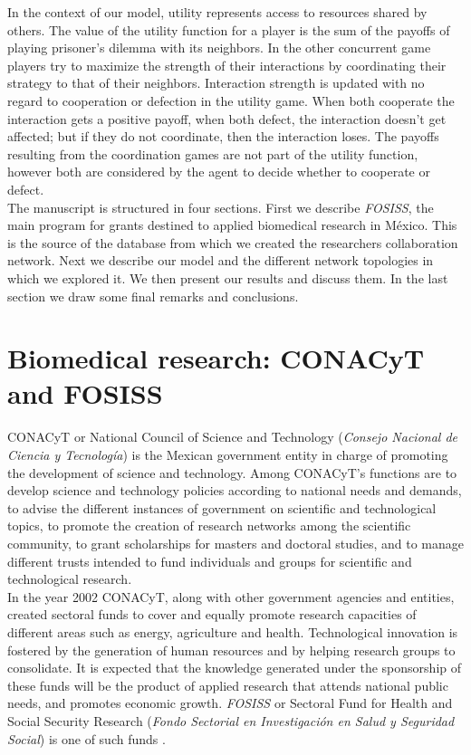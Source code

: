\documentclass{bmcart}
\begin{document}
In the context of our model, utility represents access to resources
shared by others. The value of the utility function for a player is
the sum of the payoffs of playing prisoner's dilemma with its
neighbors. In the other concurrent game players try to maximize the
strength of their interactions by coordinating their strategy to that
of their neighbors. Interaction strength is updated with no regard to
cooperation or defection in the utility game. When both cooperate the
interaction gets a positive payoff, when both defect, the interaction
doesn't get affected; but if they do not coordinate, then the
interaction loses. The payoffs resulting from the coordination games
are not part of the utility function, however both are considered by
the agent to decide whether to cooperate or defect. \\

The manuscript is structured in four sections. First we describe
\textit{FOSISS}, the main program for grants destined to applied
biomedical research in M\'exico. This is the source of the database
from which we created the researchers collaboration network. Next we
describe our model and the different network topologies in which we
explored it.  We then present our results and discuss them. In the
last section we draw some final remarks and conclusions.

\section*{Biomedical research: CONACyT and FOSISS}

CONACyT or National Council of Science and Technology (\emph{Consejo
  Nacional de Ciencia y Tecnolog\'ia}) is the Mexican government
entity in charge of promoting the development of science and
technology.  Among CONACyT's functions are to develop science and
technology policies according to national needs and demands, to advise
the different instances of government on scientific and technological
topics, to promote the creation of research networks among the
scientific community, to grant scholarships for masters and doctoral
studies, and to manage different trusts intended to fund individuals
and groups for scientific and technological research.\\

In the year 2002 CONACyT, along with other government agencies and
entities, created sectoral funds to cover and equally promote research
capacities of different areas such as energy, agriculture and
health. Technological innovation is fostered by the generation of
human resources and by helping research groups to consolidate. It is
expected that the knowledge generated under the sponsorship of these
funds will be the product of applied research that attends national
public needs, and promotes economic growth.  {\color{red}
  \emph{FOSISS} or Sectoral Fund for Health and Social Security
  Research (\emph{Fondo Sectorial en Investigaci\'on en Salud y
    Seguridad Social}) is one of such funds
  \cite{Gonzalez-etal:2008}}.\\
\end{document}
